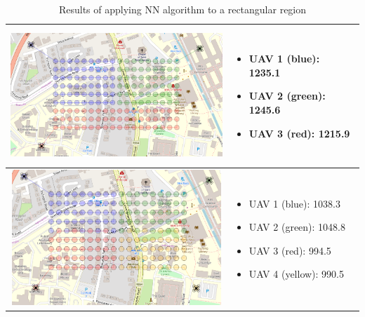 \begin{table}[h!]
\begin{tabular}{ | c | m{5cm} | }
    \begin{minipage}[c][53mm][c]{.6\textwidth}
      \includegraphics[width=\linewidth, height=51mm]{Chapters/MultiAgentCoverage/MultipleTravellingSalesman/Figs/Rectangle/ThreeAgent.PNG}
    \end{minipage}
    &
    \begin{itemize}[leftmargin=*]
    \item[] UAV 1 (blue): 1235.1
    \item[] UAV 2 (green): 1245.6
    \item[] UAV 3 (red): 1215.9
    \end{itemize}
    \\
    \hline
    
    \begin{minipage}[c][53mm][c]{.6\textwidth}
      \includegraphics[width=\linewidth, height=51mm]{Chapters/MultiAgentCoverage/MultipleTravellingSalesman/Figs/Rectangle/FourAgent.PNG}
    \end{minipage}
    &
    \begin{itemize}[leftmargin=*]
    \item[] UAV 1 (blue): 1038.3
    \item[] UAV 2 (green): 1048.8
    \item[] UAV 3 (red): 994.5
    \item[] UAV 4 (yellow): 990.5
    \end{itemize}

    \\
    \hline
  \end{tabular}
  \caption{Results of applying NN algorithm to a rectangular region}\label{table:NNAlgoResultsRect}
\end{table}


